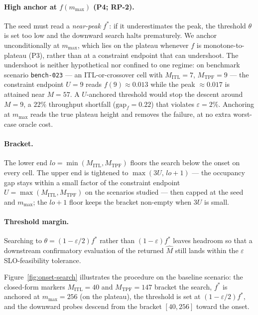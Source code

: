 \paragraph{High anchor at $f(m_{\max})$ (P4; RP-2).}
The seed must read a \emph{near-peak} $f^\ast$: if it underestimates the peak, the threshold
$\theta$ is set too low and the downward search halts prematurely. We anchor unconditionally
at $m_{\max}$, which lies on the plateau whenever $f$ is monotone-to-plateau (P3), rather than
at a constraint endpoint that can undershoot. The undershoot is neither hypothetical nor
confined to one regime: on benchmark scenario \texttt{bench-023} --- an ITL-or-crossover cell
with $M_{\mathrm{ITL}} = 7$, $M_{\mathrm{TPF}} = 9$ --- the constraint endpoint $U = 9$ reads
$f(9) \approx 0.013$ while the peak $\approx 0.017$ is attained near $M = 57$. A $U$-anchored
threshold would stop the descent around $M = 9$, a $22\%$ throughput shortfall
($\mathrm{gap}_f = 0.22$) that violates $\varepsilon = 2\%$. Anchoring at $m_{\max}$ reads the
true plateau height and removes the failure, at no extra worst-case oracle cost.

\paragraph{Bracket.}
The lower end $\mathit{lo} = \min(M_{\mathrm{ITL}}, M_{\mathrm{TPF}})$ floors the search below
the onset on every cell. The upper end is tightened to $\max(3U,\, \mathit{lo}+1)$ --- the
occupancy gap stays within a small factor of the constraint endpoint $U = \max(M_{\mathrm{ITL}},
M_{\mathrm{TPF}})$ on the scenarios studied --- then capped at the seed and $m_{\max}$; the
$\mathit{lo}+1$ floor keeps the bracket non-empty when $3U$ is small.

\paragraph{Threshold margin.}
Searching to $\theta = (1-\varepsilon/2)f^\ast$ rather than $(1-\varepsilon)f^\ast$ leaves
headroom so that a downstream confirmatory evaluation of the returned $\hat M$ still lands
within the $\varepsilon$ SLO-feasibility tolerance.

Figure~\ref{fig:onset-search} illustrates the procedure on the baseline scenario: the
closed-form markers $M_{\mathrm{ITL}} = 40$ and $M_{\mathrm{TPF}} = 147$ bracket the search,
$f^\ast$ is anchored at $m_{\max} = 256$ (on the plateau), the threshold is set at
$(1-\varepsilon/2)f^\ast$, and the downward probes descend from the bracket $[40, 256]$ toward
the onset.

